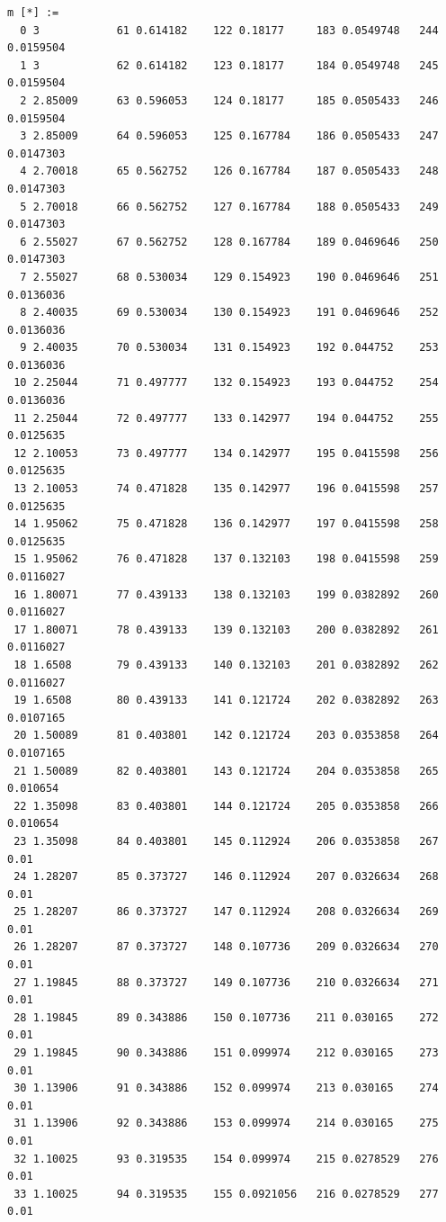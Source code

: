 \documentclass{article}
\begin{document}
\begin{verbatim}
m [*] :=
  0 3            61 0.614182    122 0.18177     183 0.0549748   244 0.0159504
  1 3            62 0.614182    123 0.18177     184 0.0549748   245 0.0159504
  2 2.85009      63 0.596053    124 0.18177     185 0.0505433   246 0.0159504
  3 2.85009      64 0.596053    125 0.167784    186 0.0505433   247 0.0147303
  4 2.70018      65 0.562752    126 0.167784    187 0.0505433   248 0.0147303
  5 2.70018      66 0.562752    127 0.167784    188 0.0505433   249 0.0147303
  6 2.55027      67 0.562752    128 0.167784    189 0.0469646   250 0.0147303
  7 2.55027      68 0.530034    129 0.154923    190 0.0469646   251 0.0136036
  8 2.40035      69 0.530034    130 0.154923    191 0.0469646   252 0.0136036
  9 2.40035      70 0.530034    131 0.154923    192 0.044752    253 0.0136036
 10 2.25044      71 0.497777    132 0.154923    193 0.044752    254 0.0136036
 11 2.25044      72 0.497777    133 0.142977    194 0.044752    255 0.0125635
 12 2.10053      73 0.497777    134 0.142977    195 0.0415598   256 0.0125635
 13 2.10053      74 0.471828    135 0.142977    196 0.0415598   257 0.0125635
 14 1.95062      75 0.471828    136 0.142977    197 0.0415598   258 0.0125635
 15 1.95062      76 0.471828    137 0.132103    198 0.0415598   259 0.0116027
 16 1.80071      77 0.439133    138 0.132103    199 0.0382892   260 0.0116027
 17 1.80071      78 0.439133    139 0.132103    200 0.0382892   261 0.0116027
 18 1.6508       79 0.439133    140 0.132103    201 0.0382892   262 0.0116027
 19 1.6508       80 0.439133    141 0.121724    202 0.0382892   263 0.0107165
 20 1.50089      81 0.403801    142 0.121724    203 0.0353858   264 0.0107165
 21 1.50089      82 0.403801    143 0.121724    204 0.0353858   265 0.010654
 22 1.35098      83 0.403801    144 0.121724    205 0.0353858   266 0.010654
 23 1.35098      84 0.403801    145 0.112924    206 0.0353858   267 0.01
 24 1.28207      85 0.373727    146 0.112924    207 0.0326634   268 0.01
 25 1.28207      86 0.373727    147 0.112924    208 0.0326634   269 0.01
 26 1.28207      87 0.373727    148 0.107736    209 0.0326634   270 0.01
 27 1.19845      88 0.373727    149 0.107736    210 0.0326634   271 0.01
 28 1.19845      89 0.343886    150 0.107736    211 0.030165    272 0.01
 29 1.19845      90 0.343886    151 0.099974    212 0.030165    273 0.01
 30 1.13906      91 0.343886    152 0.099974    213 0.030165    274 0.01
 31 1.13906      92 0.343886    153 0.099974    214 0.030165    275 0.01
 32 1.10025      93 0.319535    154 0.099974    215 0.0278529   276 0.01
 33 1.10025      94 0.319535    155 0.0921056   216 0.0278529   277 0.01

\end{verbatim}
\end{document}
